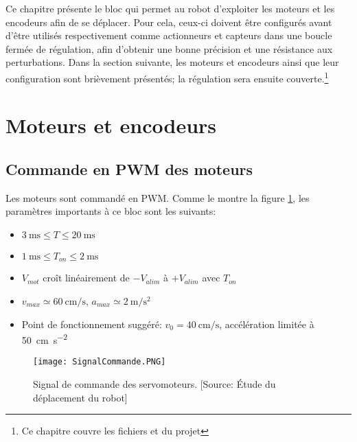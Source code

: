 Ce chapitre présente le bloc qui permet au robot d'exploiter les moteurs et les encodeurs afin de se déplacer. Pour cela, ceux-ci doivent être configurés avant d'être utilisés respectivement comme actionneurs et capteurs dans une boucle fermée de régulation, afin d'obtenir une bonne précision et une résistance aux perturbations. Dans la section suivante, les moteurs et encodeurs ainsi que leur configuration sont brièvement présentés; la régulation sera ensuite couverte.\footnote{Ce chapitre couvre les fichiers  et  du projet }

\section{Moteurs et encodeurs}
\subsection{Commande en PWM des moteurs}
Les moteurs sont commandé en PWM. Comme le montre la figure \ref{fig:SignalServo}, les paramètres importants à ce bloc sont les suivants:
\begin{itemize}
  \item $\SI{3}{\milli\second} \leq T \leq \SI{20}{\milli\second}$
  \item $ \SI{1}{\milli\second} \leq T_{on} \leq \SI{2}{\milli\second}$
  \item $V_{mot}$ croît linéairement de $-V_{alim}$ à $+V_{alim}$ avec $T_{on}$
  \item $v_{max} \simeq \SI{60}{\centi\meter\per\second}$, $a_{max} \simeq \SI{2}{\meter\per\second\squared}$
  \item Point de fonctionnement suggéré: $v_0 = \SI{40}{\centi\meter\per\second}$, accélération limitée à \SI{50}{\centi\meter\per\second\squared}
\end{itemize}
\begin{figure}[htbp]
\vspace{1.5em}
\centering
\texttt{[image: SignalCommande.PNG]}
\caption{\label{fig:SignalServo}Signal de commande des servomoteurs. [Source: \'Etude du déplacement du robot]}
\end{figure}

